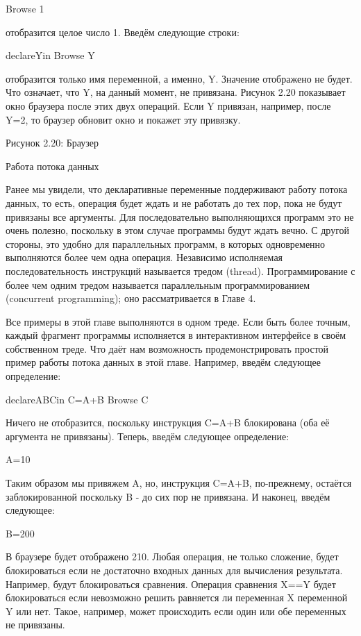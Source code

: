 {Browse 1}

отобразится целое число 1. Введём следующие строки:

declareYin
{Browse Y}

отобразится только имя переменной, а именно, Y. Значение отображено не будет. Что означает, что Y, на данный момент, не привязана. Рисунок 2.20 показывает окно браузера после этих двух операций. Если Y привязан, например, после Y=2, то браузер обновит окно и покажет эту привязку.

Рисунок 2.20: Браузер

Работа потока данных

Ранее мы увидели, что декларативные переменные поддерживают работу потока данных, то есть, операция будет ждать и не работать до тех пор, пока не будут привязаны все аргументы. Для последовательно выполняющихся программ это не очень полезно, поскольку в этом случае программы будут ждать вечно. С другой стороны, это удобно для параллельных программ, в которых одновременно выполняются более чем одна операция. Независимо исполняемая последовательность инструкций называется тредом (thread). Программирование с более чем одним тредом называется параллельным программированием (concurrent programming); оно рассматривается в Главе 4.

Все примеры в этой главе выполняются в одном треде. Если быть более точным, каждый фрагмент программы исполняется в интерактивном интерфейсе в своём собственном треде. Что даёт нам возможность продемонстрировать простой пример работы потока данных в этой главе. Например, введём следующее определение:

declareABCin
C=A+B
{Browse C}

Ничего не отобразится, поскольку инструкция C=A+B блокирована (оба её аргумента не привязаны). Теперь, введём следующее определение:

A=10

Таким образом мы привяжем A, но, инструкция C=A+B, по-прежнему, остаётся заблокированной поскольку B - до сих пор не привязана. И наконец, введём следующее:

B=200

В браузере будет отображено 210. Любая операция, не только сложение, будет блокироваться если не достаточно входных данных для вычисления результата. Например, будут блокироваться сравнения. Операция сравнения X==Y будет блокироваться если невозможно решить равняется ли переменная X переменной Y или нет. Такое, например, может происходить если один или обе переменных не привязаны.

